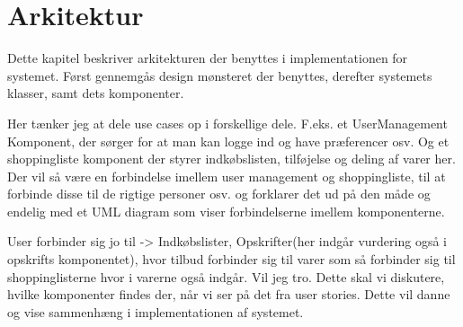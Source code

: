 \section{Arkitektur}
Dette kapitel beskriver arkitekturen der benyttes i implementationen for systemet.
Først gennemgås design mønsteret der benyttes, derefter systemets klasser, samt dets komponenter.







Her tænker jeg at dele use cases op i forskellige dele.
F.eks. et UserManagement Komponent, der sørger for at man kan logge ind og have præferencer osv.
Og et shoppingliste komponent der styrer indkøbslisten, tilføjelse og deling af varer her. Der vil så være en forbindelse imellem user management og shoppingliste, til at forbinde disse til de rigtige personer osv. og forklarer det ud på den måde og endelig med et UML diagram som viser forbindelserne imellem komponenterne.

User forbinder sig jo til -> Indkøbslister, Opskrifter(her indgår vurdering også i opskrifts komponentet), hvor tilbud forbinder sig til varer som så forbinder sig til shoppinglisterne hvor i varerne også indgår. Vil jeg tro. Dette skal vi diskutere, hvilke komponenter findes der, når vi ser på det fra user stories. Dette vil danne og vise sammenhæng i implementationen af systemet.